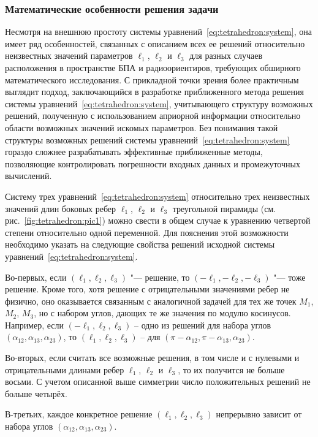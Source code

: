 \documentclass[../main.tex]{subfiles}
\begin{document}
\subsubsection{Математические особенности решения задачи}
Несмотря на внешнюю простоту системы уравнений~\eqref{eq:tetrahedron:system}, она имеет ряд особенностей, связанных с описанием всех ее решений относительно неизвестных значений параметров $\ell_1$, $\ell_2$ и $\ell_3$ для разных случаев расположения в пространстве БПА и радиоориентиров, требующих обширного математического исследования. С прикладной точки зрения более практичным выглядит подход, заключающийся в разработке приближенного метода решения системы уравнений~\eqref{eq:tetrahedron:system}, учитывающего структуру возможных решений, полученную с использованием априорной информации относительно области возможных значений искомых параметров. Без понимания такой структуры возможных решений системы уравнений~\eqref{eq:tetrahedron:system} гораздо сложнее разрабатывать эффективные приближенные методы, позволяющие контролировать погрешности входных данных и промежуточных вычислений.

Систему трех уравнений~\eqref{eq:tetrahedron:system} относительно трех неизвестных значений длин боковых ребер $\ell_1$, $\ell_2$ и $\ell_3$ треугольной пирамиды (см. рис.~\ref{fig:tetrahedron:pic1}) можно свести в общем случае к уравнению четвертой степени относительно одной переменной. Для пояснения этой возможности необходимо указать на следующие свойства решений исходной системы уравнений~\eqref{eq:tetrahedron:system}.

Во-первых, если $\left(\ell_1, \ell_2, \ell_3\right)$ "--- решение, то $\left(-\ell_1, -\ell_2, -\ell_3\right)$ "--- тоже решение. Кроме того, хотя решение с отрицательными значениями ребер не физично, оно оказывается связанным с аналогичной задачей для тех же точек $M_1$, $M_2$, $M_3$, но с набором углов, дающих те же значения по модулю косинусов. Например, если $\left(-\ell_1, \ell_2, \ell_3\right)$ -- одно из решений для набора углов $\left(\alpha_{12}, \alpha_{13}, \alpha_{23}\right)$, то $\left(\ell_1, \ell_2, \ell_3\right)$ -- для $\left(\pi-\alpha_{12}, \pi-\alpha_{13}, \alpha_{23}\right)$.

Во-вторых, если считать все возможные решения, в том числе и с нулевыми и отрицательными длинами ребер $\ell_1$, $\ell_2$ и $\ell_3$, то их получится не больше восьми. С учетом описанной выше симметрии число положительных решений не больше четырёх.

В-третьих, каждое конкретное решение $\left(\ell_1, \ell_2, \ell_3\right)$ непрерывно зависит от набора углов $\left(\alpha_{12}, \alpha_{13}, \alpha_{23}\right)$.
\end{document}

